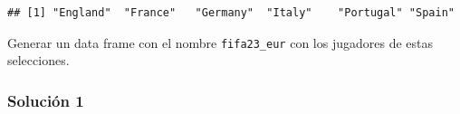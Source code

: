 \documentclass[
]{article}
\newenvironment{Shaded}{\begin{snugshade}}{\end{snugshade}}
\newcommand{\FunctionTok}[1]{\textcolor[rgb]{0.00,0.00,0.00}{#1}}
\newcommand{\NormalTok}[1]{#1}
\newcommand{\OtherTok}[1]{\textcolor[rgb]{0.56,0.35,0.01}{#1}}
\newcommand{\SpecialCharTok}[1]{\textcolor[rgb]{0.00,0.00,0.00}{#1}}
\begin{document}
\begin{verbatim}
## [1] "England"  "France"   "Germany"  "Italy"    "Portugal" "Spain"
\end{verbatim}

Generar un data frame con el nombre \texttt{fifa23\_eur} con los
jugadores de estas selecciones.

\hypertarget{soluciuxf3n-1}{%
\subsubsection{Solución 1}\label{soluciuxf3n-1}}

\begin{Shaded}
\end{Shaded}
\end{document}
